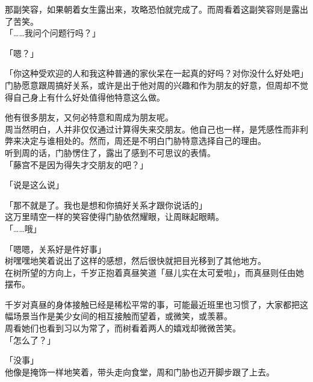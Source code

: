 那副笑容，如果朝着女生露出来，攻略恐怕就完成了。而周看着这副笑容则是露出了苦笑。\\

「……我问个问题行吗？」

「嗯？」

「你这种受欢迎的人和我这种普通的家伙呆在一起真的好吗？对你没什么好处吧」\\

门胁愿意跟周搞好关系，或许是出于他对周的兴趣和作为朋友的好意，但周却不觉得自己身上有什么好处值得他特意这么做。

他有很多朋友，又何必特意和周成为朋友呢。\\

周当然明白，人并非仅仅通过计算得失来交朋友。他自己也一样，是凭感性而非利弊来决定与谁相处的。然而，周还是不明白门胁特意选择自己的理由。\\

听到周的话，门胁愣住了，露出了感到不可思议的表情。\\

「藤宫不是因为得失才交朋友的吧？」

「说是这么说」

「那不就是了。我也是想和你搞好关系才跟你说话的」\\

这万里晴空一样的笑容使得门胁依然耀眼，让周眯起眼睛。\\

「……哦」

「嗯嗯，关系好是件好事」\\

树嘿嘿地笑着说出了这样的感想，然后很快就把目光移到了其他地方。\\

在树所望的方向上，千岁正抱着真昼笑道「昼儿实在太可爱啦」，而真昼则任由她摆布。

千岁对真昼的身体接触已经是稀松平常的事，可能最近班里也习惯了，大家都把这幅场景当作是美少女间的相互接触而望着，或微笑，或羡慕。\\

周看她们也看到习以为常了，而树看着两人的嬉戏却微微苦笑。\\

「怎么了？」

「没事」\\

他像是掩饰一样地笑着，带头走向食堂，周和门胁也迈开脚步跟了上去。\\

\vspace{2\baselineskip}

